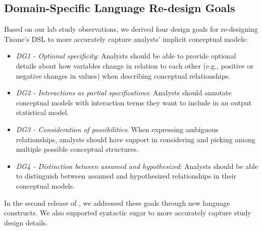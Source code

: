 \subsection{Domain-Specific Language Re-design Goals} \label{sec:rtisane_design_implications} 

Based on our lab study observations, we derived four design goals for
re-designing Tisane's DSL to more accurately capture analysts' implicit
conceptual models: 

\def\optionalSpecificity{\textit{DG1 - Optional specificity}\xspace}
\def\interactionAsPartialSpec{\textit{DG2 - Interactions as partial specifications}\xspace}
\def\considerPossibilities{\textit{DG3 - Consideration of possibilities}\xspace}
\def\assumeHypothesize{\textit{DG4 - Distinction between assumed and hypothesized}\xspace}
\begin{itemize}
    \item \optionalSpecificity: Analysts should be able to provide optional
    details about how variables change in relation to each other (e.g., positive
    or negative changes in values) when describing conceptual relationships.
    \item \interactionAsPartialSpec: Analysts should annotate conceptual models with interaction terms they want to include in an output statistical model. 
    \item \considerPossibilities: When expressing ambiguous relationships, analysts should have support
    in considering and picking among multiple possible conceptual structures.
    \item \assumeHypothesize: Analysts should be able to distinguish between assumed and hypothesized relationships in their conceptual models. 
\end{itemize}

In the second release of \tisane, we addressed these goals through new language
constructs. We also supported syntactic sugar to more accurately capture
study design details. 


